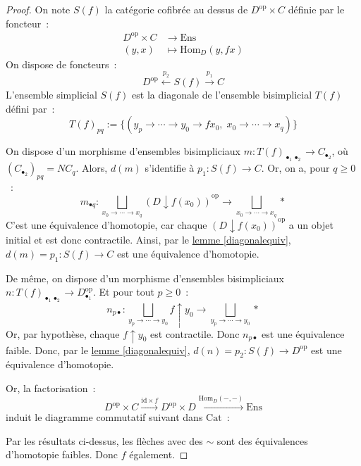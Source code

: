 \documentclass{amsart}
\newcommand{\sref}[2]{\hyperref[#2]{#1 \ref*{#2}}}
\theoremstyle{plain}
\theoremstyle{definition}
\theoremstyle{remark}
\newcommand{\Hom}[3]{\mathrm{Hom}_{#1}(#2,#3)}
\newcommand{\id}{\mathrm{id}}
\newcommand{\op}{^\mathrm{op}}
\newcommand{\Ens}{\mathrm{Ens}}
\newcommand{\Cat}{\mathrm{Cat}}
\newcommand{\ra}{\rightarrow}
\newcommand{\lra}{\longrightarrow}
\begin{document}
\begin{proof}
  On note $S(f)$ la catégorie cofibrée au dessus de $D\op\times C$ définie par le foncteur~:
  \begin{align*}
    D\op\times C &\ra     \Ens \\
    (y,x)        &\mapsto \Hom{D}{y}{fx}
  \end{align*}
  On dispose de foncteurs~:
  $$D\op\overset{p_2}{\longleftarrow} S(f) \overset{p_1}{\lra} C$$
  L'ensemble simplicial $S(f)$ est la diagonale de l'ensemble bisimplicial $T(f)$ défini par~:
  $$T(f)_{pq}:=\{(y_p\ra\dotsb\ra y_0\ra fx_0,\;x_0\ra\dotsb\ra x_q)\}$$
  
  On dispose d'un morphisme d'ensembles bisimpliciaux $m:T(f)_{\bullet_1\bullet_2}\ra C_{\bullet_2}$, où $(C_{\bullet_2})_{pq}=NC_q$.
  Alors, $d(m)$ s'identifie à $p_1:S(f)\ra C$. Or, on a, pour $q\geq 0$~:
  $$m_{\bullet q}:\bigsqcup_{x_0\ra\dotsb\ra x_q} (D\downarrow f(x_0))\op \ra \bigsqcup_{x_0\ra\dotsb\ra x_q} *$$
  C'est une équivalence d'homotopie, car chaque $(D\downarrow f(x_0))\op$ a un objet initial et est donc contractile.
  Ainsi, par le \sref{lemme}{diagonalequiv}, $d(m)=p_1:S(f)\ra C$ est une équivalence d'homotopie.

  De même, on dispose d'un morphisme d'ensembles bisimpliciaux $n:T(f)_{\bullet_1\bullet_2}\ra D\op_{\bullet_1}$. Et pour tout $p\geq 0$~:
  $$n_{p\bullet}:\bigsqcup_{y_p\ra\dotsb\ra y_0} f\uparrow y_0 \ra \bigsqcup_{y_p\ra\dotsb\ra y_0} *$$
  Or, par hypothèse, chaque $f\uparrow y_0$ est contractile. Donc $n_{p\bullet}$ est une équivalence faible.
  Donc, par le \sref{lemme}{diagonalequiv}, $d(n)=p_2:S(f)\ra D\op$ est une équivalence d'homotopie.

  Or, la factorisation~:
  $$D\op\times C \overset{\id\times f}{\lra} D\op\times D\overset{\Hom{D}{-}{-}}{\lra} \Ens$$
  induit le diagramme commutatif suivant dans $\Cat$~:
  \begin{center}
  \end{center}
  Par les résultats ci-dessus, les flèches avec des $\sim$ sont des équivalences d'homotopie faibles.
  Donc $f$ également.
\end{proof}
\end{document}
